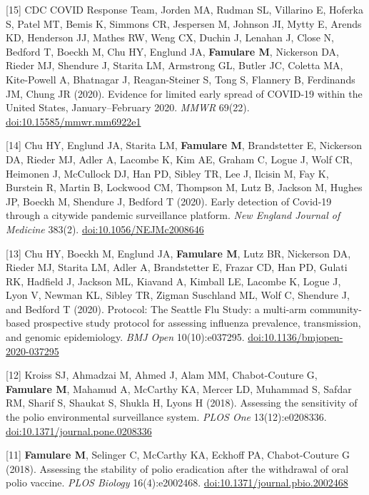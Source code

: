 \documentclass{article}
\begin{document}
\begin{llist}
\begin{items}
\item[{[15]}] CDC COVID Response Team, Jorden MA, Rudman SL, Villarino E, Hoferka S, Patel MT, Bemis K, Simmons CR, Jespersen M, Johnson JI, Mytty E, Arends KD, Henderson JJ, Mathes RW, Weng CX, Duchin J, Lenahan J, Close N, Bedford T, Boeckh M, Chu HY, Englund JA, \textbf{Famulare M}, Nickerson DA, Rieder MJ, Shendure J, Starita LM, Armstrong GL, Butler JC, Coletta MA, Kite-Powell A, Bhatnagar J, Reagan-Steiner S, Tong S, Flannery B, Ferdinands JM, Chung JR (2020). Evidence for limited early spread of COVID-19 within the United States, January–February 2020. \emph{MMWR} 69(22). \href{https://doi.org/10.15585/mmwr.mm6922e1}{doi:10.15585/mmwr.mm6922e1}

\item[{[14]}] Chu HY, Englund JA, Starita LM, \textbf{Famulare M}, Brandstetter E, Nickerson DA, Rieder MJ, Adler A, Lacombe K, Kim AE, Graham C, Logue J, Wolf CR, Heimonen J, McCullock DJ, Han PD, Sibley TR, Lee J, Ilcisin M, Fay K, Burstein R, Martin B, Lockwood CM, Thompson M, Lutz B, Jackson M, Hughes JP, Boeckh M, Shendure J, Bedford T (2020). Early detection of Covid-19 through a citywide pandemic surveillance platform. \emph{New England Journal of Medicine} 383(2). \href{https://doi.org/10.1056/NEJMc2008646}{doi:10.1056/NEJMc2008646}

\item[{[13]}] Chu HY, Boeckh M, Englund JA, \textbf{Famulare M}, Lutz BR, Nickerson DA, Rieder MJ, Starita LM, Adler A, Brandstetter E, Frazar CD, Han PD, Gulati RK, Hadfield J, Jackson ML, Kiavand A, Kimball LE, Lacombe K, Logue J, Lyon V, Newman KL, Sibley TR, Zigman Suschland ML, Wolf C, Shendure J, and Bedford T (2020). Protocol: The Seattle Flu Study: a multi-arm community-based prospective study protocol for assessing influenza prevalence, transmission, and genomic epidemiology. \emph{BMJ Open} 10(10):e037295. \href{https://doi.org/10.1136/bmjopen-2020-037295}{doi:10.1136/bmjopen-2020-037295}


\item[{[12]}] Kroiss SJ, Ahmadzai M, Ahmed J, Alam MM, Chabot-Couture G, \textbf{Famulare M}, Mahamud A, McCarthy KA, Mercer LD, Muhammad S, Safdar RM, Sharif S, Shaukat S, Shukla H, Lyons H (2018). Assessing the sensitivity of the polio environmental surveillance system. \emph{PLOS One} 13(12):e0208336. \href{https://doi.org/10.1371/journal.pone.0208336}{doi:10.1371/journal.pone.0208336}

\item[{[11]}] \textbf{Famulare M}, Selinger C, McCarthy KA, Eckhoff PA, Chabot-Couture G (2018). Assessing the stability of polio eradication after the withdrawal of oral polio vaccine. \emph{PLOS Biology} 16(4):e2002468. \href{https://doi.org/10.1371/journal.pbio.2002468}{doi:10.1371/journal.pbio.2002468}


\end{items}
\end{llist}
\end{document}
